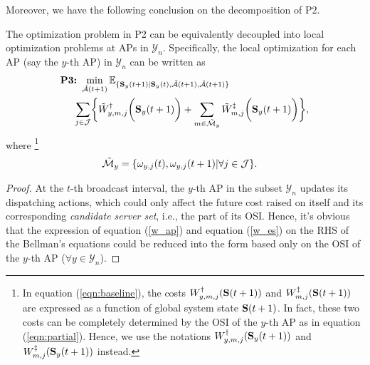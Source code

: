 Moreover, we have the following conclusion on the decomposition of P2.
\begin{lemma}[]
    The optimization problem in P2 can be equivalently decoupled into local optimization problems at APs in $\mathcal{Y}_n$. %
    Specifically, {the local optimization for each AP (say the $y$-th AP) in $\mathcal{Y}_n$ can be written as} %
    \small{
    \begin{align}
        &\textbf{P3:}~
        \min_{ \tilde{\mathcal{A}}(t+1) } %
        \mathbb{E}_{\set{ \Stat_{y}(t+1)|\Stat_{y}(t), \tilde{\mathcal{A}}(t+1),\hat{\mathcal{A}}(t+1) }}
        \nonumber\\
        &~~~~\sum_{j\in\jSpace}
        \Brace{
            \tilde{W}^{\AP}_{y,m,j}\Paren{\Stat_{y}(t+1)}
            + \sum_{m\in\tilde{\esSet}_{y}} \tilde{W}^{\ES}_{m,j}\Paren{\Stat_{y}(t+1)}
        },
        \label{eqn:partial}
    \end{align}
    }%
    where \footnote{In equation (\ref{eqn:baseline}), the costs $W^{\dagger}_{y,m,j}(\mathbf{S}(t+1))$ and $W^{\ddagger}_{m,j}(\mathbf{S}(t+1))$ are expressed as a function of global system state $\mathbf{S}(t+1)$. In fact, these two costs can be completely determined by the OSI of the $y$-th AP as in equation (\ref{eqn:partial}). Hence, we use the notations $W^{\dagger}_{y,m,j}(\mathbf{S}_y(t+1))$ and $W^{\ddagger}_{m,j}(\mathbf{S}_y(t+1))$ instead.}
    {\small
    \begin{align*}
       \tilde{\mathcal{M}}_{y} &= \{\omega_{y,j}(t), \omega_{y,j}(t+1) | \forall j\in\mathcal{J}\}.
    \end{align*}
    }%
    \label{lemma:w_partial}
\end{lemma}
\begin{proof}
    At the $t$-th broadcast interval, the $y$-th AP in the subset $\mathcal{Y}_{n}$ updates its dispatching actions, which could only affect the future cost raised on itself and its corresponding \emph{candidate server set}, i.e., the part of its OSI.
    Hence, it's obvious that the expression of equation (\ref{w_ap}) and equation (\ref{w_es}) on the RHS of the Bellman's equations could be reduced into the form based only on the OSI of the $y$-th AP ($\forall y\in\mathcal{Y}_{n}$).
\end{proof}
